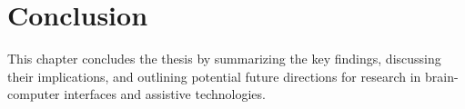 \chapter{Conclusion}
\label{chapter5}

\begin{paragraph}
This chapter concludes the thesis by summarizing the key findings, discussing their implications, and outlining potential future directions for research in brain-computer interfaces and assistive technologies.
\end{paragraph}
